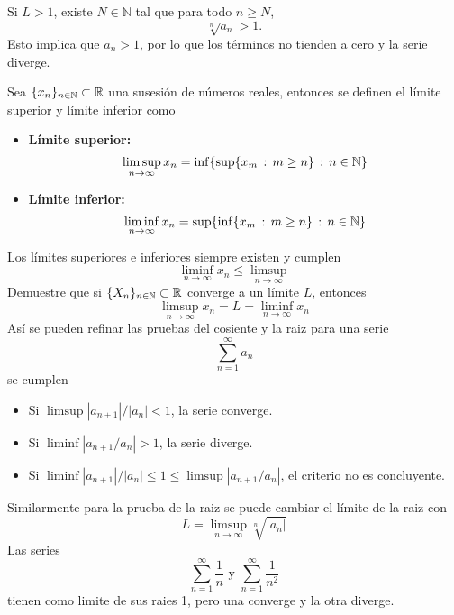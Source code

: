 \documentclass[main.tex]{subfiles}
\begin{document}
Si \(L > 1\), existe \(N \in \mathbb{N}\) tal que para todo \(n \geq N\),
\[
\sqrt[n]{a_n} > 1.
\]
Esto implica que \(a_n > 1\), por lo que los términos no tienden a cero y la serie diverge.
\QED\\
\begin{def.}
Sea \(\{x_n\}_{n\in \mathbb N }\subset\mathbb R \) una susesión de números reales, entonces se definen el límite superior y límite inferior como
\begin{itemize}
\item \textbf{Límite superior:}
    \[\limsup_{n\to\infty}x_n=\inf\{\sup\{x_m\,:\,m\geq n\}\,:\,n\in \mathbb N \}\]
\item \textbf{Límite inferior:}
    \[\liminf_{n\to\infty}x_n=\sup\{\inf\{x_m\,:\,m\geq n\}\,:\,n\in \mathbb N \}\]
\end{itemize}
\end{def.}
\obs Los límites superiores e inferiores siempre existen y cumplen
\[
\liminf_{n\to\infty}x_n\leq\limsup_{n\to\infty}
\]
\exe Demuestre que si \(\{X_n\}_{n\in \mathbb N }\subset\mathbb R \) converge a un límite \(L\), entonces
\[
\limsup_{n\to\infty}x_n=L=\liminf_{n\to\infty}x_n
\]
Así se pueden refinar las pruebas del cosiente y la raiz para una serie
\[
\sum_{n=1}^\infty a_n
\]
se cumplen
\begin{itemize}
    \item Si \(\limsup|a_{n+1}|/|a_n| < 1\), la serie converge.
    \item Si \(\liminf|a_{n+1}/a_n| > 1\), la serie diverge.
    \item Si \(\liminf|a_{n+1}|/|a_n| \leq 1\leq\limsup|a_{n+1}/a_n|\), el criterio no es concluyente.
\end{itemize}
\noindent Similarmente para la prueba de la raiz se puede cambiar el límite de la raiz con
\[
L=\limsup_{n\to\infty}\sqrt[n]{|a_n|}
\]
\obs Las series
\[
\sum_{n=1}^{\infty}\frac{1}{n}\text{ y }\sum_{n=1}^{\infty}\frac{1}{n^2}
\]
tienen como limite de sus raies 1, pero una converge y la otra diverge.
\end{document}
